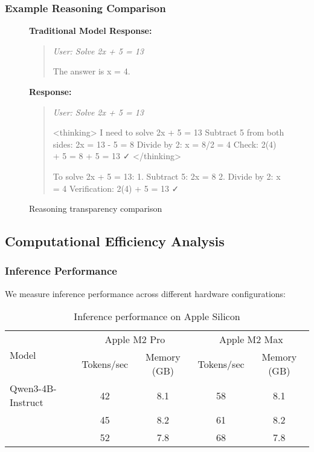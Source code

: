 \begin{table}[H]
\begin{table}[H]
\subsubsection{Example Reasoning Comparison}

\begin{figure}[H]
\begin{minipage}{0.48\textwidth}
\textbf{Traditional Model Response:}
\begin{quote}
\footnotesize
\textit{User: Solve 2x + 5 = 13}

The answer is x = 4.
\end{quote}
\end{minipage}
\hfill
\begin{minipage}{0.48\textwidth}
\textbf{\supra{} Response:}
\begin{quote}
\footnotesize
\textit{User: Solve 2x + 5 = 13}

<thinking>
I need to solve 2x + 5 = 13
Subtract 5 from both sides:
2x = 13 - 5 = 8
Divide by 2:
x = 8/2 = 4
Check: 2(4) + 5 = 8 + 5 = 13 ✓
</thinking>

To solve 2x + 5 = 13:
1. Subtract 5: 2x = 8
2. Divide by 2: x = 4
Verification: 2(4) + 5 = 13 ✓
\end{quote}
\end{minipage}
\caption{Reasoning transparency comparison}
\label{fig:reasoning-example}
\end{figure}

\subsection{Computational Efficiency Analysis}

\subsubsection{Inference Performance}

We measure inference performance across different hardware configurations:

\begin{table}[H]
\centering
\begin{tabular}{lcccc}
\toprule
\multirow{2}{*}{Model} & \multicolumn{2}{c}{Apple M2 Pro} & \multicolumn{2}{c}{Apple M2 Max} \\
\cmidrule(lr){2-3} \cmidrule(lr){4-5}
& Tokens/sec & Memory (GB) & Tokens/sec & Memory (GB) \\
\midrule
Qwen3-4B-Instruct & 42 & 8.1 & 58 & 8.1 \\
\textbf{\supra{}} & 45 & 8.2 & 61 & 8.2 \\
\textbf{\zennano{}} & 52 & 7.8 & 68 & 7.8 \\
\bottomrule
\end{tabular}
\caption{Inference performance on Apple Silicon}
\label{tab:inference-performance}
\end{table}


\end{table}
\end{table}
